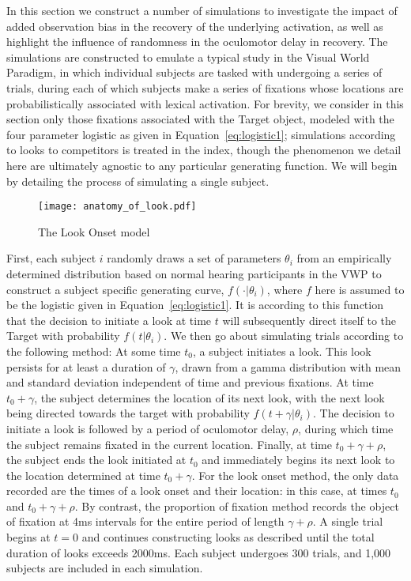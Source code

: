 In this section we construct a number of simulations to investigate the impact of added observation bias in the recovery of the underlying activation, as well as highlight the influence of randomness in the oculomotor delay in recovery. The simulations are constructed to emulate a typical study in the Visual World Paradigm, in which individual subjects are tasked with undergoing a series of trials, during each of which subjects make a series of fixations whose locations are probabilistically associated with lexical activation. For brevity, we consider in this section only those fixations associated with the Target object, modeled with the four parameter logistic as given in Equation~\ref{eq:logistic1}; simulations according to looks to competitors is treated in the index, though the phenomenon we detail here are ultimately agnostic to any particular generating function. We will begin by detailing the process of simulating a single subject. 


\begin{figure}[H]
\centering
\texttt{[image: anatomy\_of\_look.pdf]}
\caption{The Look Onset model}
\label{fig:anatomy_of_look}
\end{figure}


First, each subject $i$ randomly draws a set of parameters $\theta_i$ from an empirically determined distribution based on normal hearing participants in the VWP \citep{FarrisTrimble2014} to construct a subject specific generating curve, $f(\cdot | \theta_i)$, where $f$ here is assumed to be the logistic given in Equation~\ref{eq:logistic1}.  It is according to this function that the decision to initiate a look at time $t$ will subsequently direct itself to the Target with probability $f(t|\theta_i)$. We then go about simulating trials according to the following method: At some time $t_0$, a subject initiates a look. This look persists for at least a duration of $\gamma$, drawn from a gamma distribution with mean and standard deviation independent of time and previous fixations. At time $t_0+\gamma$, the subject determines the location of its next look, with the next look being directed towards the target with probability $f(t+\gamma | \theta_i)$. The decision to initiate a look is followed by a period of oculomotor delay, $\rho$, during which time the subject remains fixated in the current location. Finally, at time $t_0 + \gamma + \rho$, the subject ends the look initiated at $t_0$ and immediately begins its next look to the location determined at time $t_0 + \gamma$. For the look onset method, the only data recorded are the times of a look onset and their location: in this case, at times $t_0$ and $t_0 + \gamma + \rho$. By contrast, the proportion of fixation method records the object of fixation at 4ms intervals for the entire period of length $\gamma + \rho$. A single trial begins at $t = 0$ and continues constructing looks as described until the total duration of looks exceeds 2000ms. Each subject undergoes 300 trials, and 1,000 subjects are included in each simulation.

